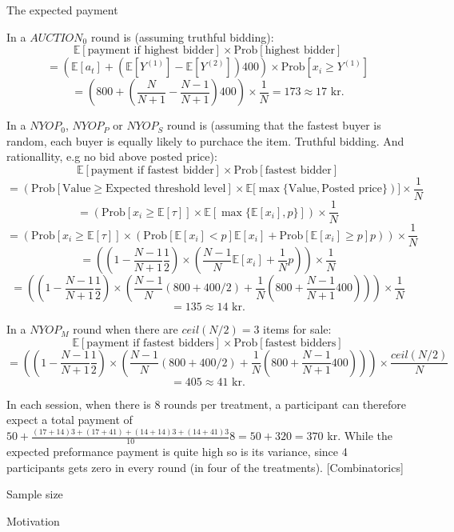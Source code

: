 \documentclass[a4paper,12pt]{article}
\begin{document}
	The expected payment
	
	In a $AUCTION_0$ round is (assuming truthful bidding):
	\[ \mathbb{E}[\mbox{payment if highest bidder}] \times \mbox{Prob}[\mbox{highest bidder}] \] 
	\[  = \left( \mathbb{E}[a_t] + (\mathbb{E}[Y^{(1)}]-\mathbb{E}[Y^{(2)}]) 400 \right) \times \mbox{Prob}[x_i \ge Y^{(1)}] \] 
	\[	= \left( 800 + \left(\frac{N}{N+1} - \frac{N-1}{N+1}\right)400 \right) \times \frac{1}{N} = 173 \approx 17\mbox{ kr.} \]
	
	In a $NYOP_0$, $NYOP_P$ or $NYOP_S$ round is (assuming that the fastest buyer is random, each buyer is equally likely to purchace the item. Truthful bidding. And rationallity, e.g no bid above posted price):
	\[ \mathbb{E}[\mbox{payment if fastest bidder}] \times \mbox{Prob}[\mbox{fastest bidder}] \] 
	\[  = \left( \mbox{Prob}[\mbox{Value} \ge \mbox{Expected threshold level}] \times \mathbb{E}[\max\{\mbox{Value}, \mbox{Posted price}\} \right)] \times \frac{1}{N} \] 
	\[  = \left( \mbox{Prob}[x_i \ge \mathbb{E}[\tau]] \times \mathbb{E}[\max\{\mathbb{E}[x_i], p\}]  \right) \times \frac{1}{N} \] 
	\[  = \left( \mbox{Prob}[x_i \ge \mathbb{E}[\tau]] \times ( \mbox{Prob}[\mathbb{E}[x_i] < p] \mathbb{E}[x_i] + \mbox{Prob}[\mathbb{E}[x_i] \ge p] p ) \right) \times \frac{1}{N} \] 
	\[  = \left( \left(1-\frac{N-1}{N+1}\frac{1}{2}\right) \times \left( \frac{N-1}{N} \mathbb{E}[x_i] + \frac{1}{N} p \right) \right) \times \frac{1}{N} \] 
	\[  = \left( \left(1-\frac{N-1}{N+1}\frac{1}{2}\right) \times \left( \frac{N-1}{N} (800+400/2) + \frac{1}{N} \left(800+\frac{N-1}{N+1}400\right) \right) \right) \times \frac{1}{N} \] 
	\[	= 135 \approx 14\mbox{ kr.} \]
	
	In a $NYOP_M$ round when there are $ceil(N/2)=3$ items for sale:
	\[ \mathbb{E}[\mbox{payment if fastest bidders}] \times \mbox{Prob}[\mbox{fastest bidders}] \] 
	\[  = \left( \left(1-\frac{N-1}{N+1}\frac{1}{2}\right) \times \left( \frac{N-1}{N} (800+400/2) + \frac{1}{N} \left(800+\frac{N-1}{N+1}400\right) \right) \right) \times \frac{ceil(N/2)}{N} \] 
	\[	= 405 \approx 41\mbox{ kr.} \]
	
	In each session, when there is 8 rounds per treatment, a participant can therefore expect a total payment of $50 + \frac{(17+14)3 + (17+41) + (14+14)3 + (14+41)3}{10}8 = 50 + 320 = 370$ kr. While the expected preformance payment is quite high so is its variance, since 4 participants gets zero in every round (in four of the treatments). [Combinatorics]

	Sample size
	
	Motivation
\end{document}
